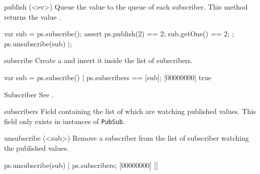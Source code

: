 \begin{urbiscriptapi}
\item[publish](<ev>)%
  Queue the value  to the queue of each subscriber.  This method
  returns the value .

\begin{urbiscript}
{
  var sub = ps.subscribe();
  assert
  {
    ps.publish(2) == 2;
    sub.getOne() == 2;
  };
  ps.unsubscribe(sub)
}|;
\end{urbiscript}


\item[subscribe] Create a  and insert it inside the list
  of subscribers.

\begin{urbiscript}
var sub = ps.subscribe() |
ps.subscribers == [sub];
[00000000] true
\end{urbiscript}


\item[Subscriber] See .


\item[subscribers] Field containing the list of  which
  are watching published values.  This field only exists in instances of
  \lstinline|PubSub|.


\item[unsubscribe](<sub>)%
  Remove a subscriber from the list of subscriber watching the published
  values.

\begin{urbiscript}
ps.unsubscribe(sub) |
ps.subscribers;
[00000000] []
\end{urbiscript}
\end{urbiscriptapi}


